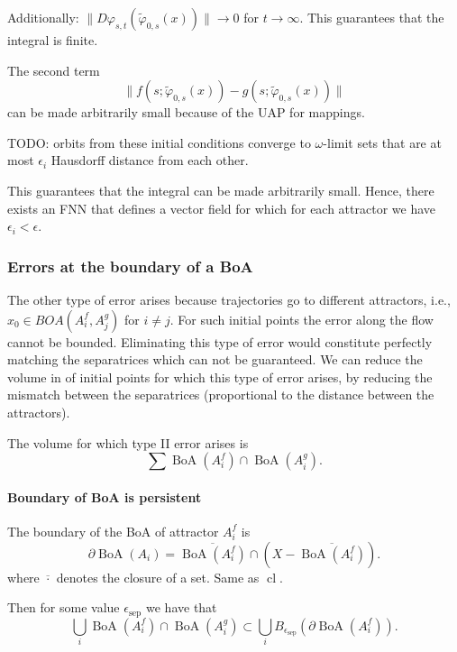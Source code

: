 \documentclass{article}
\theoremstyle{definition}
\theoremstyle{remark}
\newcommand{\cl}{\operatorname{cl}}
\newcommand{\boa}{\operatorname{BoA}}
\newcounter{ct}
\begin{document}
Additionally:
\(\|D\varphi_{s,t}(\tilde{\varphi}_{0,s}(x))\|\rightarrow 0\) for \(t\rightarrow\infty\).
%
This guarantees that the integral is finite.

The second term
\[\|f(s; \tilde{\varphi}_{0,s}(x)) - g(s; \tilde{\varphi}_{0,s}(x))\|\]
can be made arbitrarily small because of the UAP for mappings.


TODO:
orbits from these initial conditions converge to $\omega$-limit sets that are at most $\epsilon_i$ Hausdorff distance from each other.


This guarantees that the integral can be made arbitrarily small.	
Hence, there exists an FNN that defines a vector field for which for each attractor we have $\epsilon_i<\epsilon$. 






\subsubsection{Errors at the boundary of a BoA}%
The other type of error arises because trajectories go to different attractors, i.e., $x_0\in BOA(A_i^f,A_j^g)$ for $i\neq j$.
For such initial points the error along the flow cannot be bounded.
Eliminating this type of error would constitute perfectly matching the separatrices which can not be guaranteed.
We can reduce the volume in of initial points for which this type of error arises, by reducing the mismatch between the separatrices (proportional to the distance between the attractors).

The volume for which type II error arises is 
\[\sum\boa(A_i^f)\cap\boa(A_i^g).\]



\paragraph{Boundary of BoA is persistent}
The boundary of the BoA of attractor $A_i^f$ is %
\[\partial\boa(A_i) = \overline{\boa(A_i^f)} \cap (X - \overline{\boa(A_i^f)}).\]
where \(\overline{\cdot}\) denotes the closure of a set. Same as \(\cl\).

Then for some value $\epsilon_{\operatorname{sep}}$ we have that 
\begin{equation}\label{eq:separatrixoverlap}
\bigcup_i \boa(A_i^f)\cap\boa(A_i^g) \subset \bigcup_i B_{\epsilon_{\operatorname{sep}}}(\partial\boa(A_i^f)). 
\end{equation}
\end{document}
